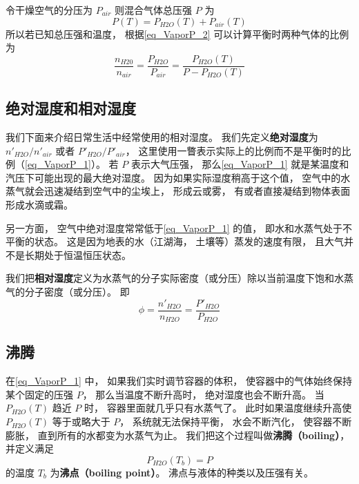 令干燥空气的分压为 $P_{air}$ 则混合气体总压强 $P$ 为
\begin{equation}
P(T) = P_{H2O}(T) + P_{air}(T)
\end{equation}
所以若已知总压强和温度， 根据\autoref{eq_VaporP_2} 可以计算平衡时两种气体的比例为
\begin{equation}\label{eq_VaporP_1}
\frac{n_{H20}}{n_{air}} = \frac{P_{H2O}}{P_{air}} = \frac{P_{H2O}(T)}{P - P_{H2O}(T)}
\end{equation}

\subsection{绝对湿度和相对湿度}
我们下面来介绍日常生活中经常使用的相对湿度。 我们先定义\textbf{绝对湿度}为 $n'_{H2O}/n'_{air}$ 或者 $P'_{H2O}/P'_{air}$， 这里使用一瞥表示实际上的比例而不是平衡时的比例（\autoref{eq_VaporP_1}）。 若 $P$ 表示大气压强， 那么\autoref{eq_VaporP_1} 就是某温度和汽压下可能出现的最大绝对湿度。 因为如果实际湿度稍高于这个值， 空气中的水蒸气就会迅速凝结到空气中的尘埃上， 形成云或雾， 有或者直接凝结到物体表面形成水滴或霜。

另一方面， 空气中绝对湿度常常低于\autoref{eq_VaporP_1} 的值， 即水和水蒸气处于不平衡的状态。 这是因为地表的水（江湖海， 土壤等）蒸发的速度有限， 且大气并不是长期处于恒温恒压状态。

我们把\textbf{相对湿度}定义为水蒸气的分子实际密度（或分压）除以当前温度下饱和水蒸气的分子密度（或分压）。 即
\begin{equation}
\phi = \frac{n'_{H2O}}{n_{H2O}} = \frac{P'_{H2O}}{P_{H2O}}
\end{equation}

\subsection{沸腾}
在\autoref{eq_VaporP_1} 中， 如果我们实时调节容器的体积， 使容器中的气体始终保持某个固定的压强 $P$， 那么当温度不断升高时， 绝对湿度也会不断升高。 当 $P_{H2O}(T)$ 趋近 $P$ 时， 容器里面就几乎只有水蒸气了。 此时如果温度继续升高使 $P_{H2O}(T)$ 等于或略大于 $P$， 系统就无法保持平衡， 水会不断汽化， 使容器不断膨胀， 直到所有的水都变为水蒸气为止。 我们把这个过程叫做\textbf{沸腾（boiling）}， 并定义满足
\begin{equation}
P_{H2O}(T_b) = P
\end{equation}
的温度 $T_b$ 为\textbf{沸点（boiling point）}。 沸点与液体的种类以及压强有关。
